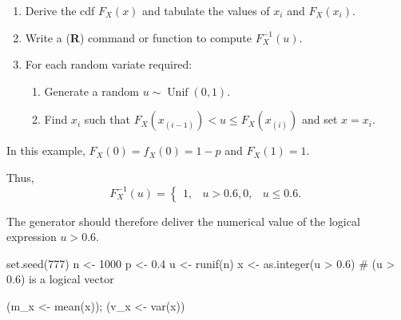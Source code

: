 \documentclass[
  letterpaper,
  DIV=11,
  numbers=noendperiod]{scrreprt}
\newenvironment{Shaded}{\begin{snugshade}}{\end{snugshade}}
\newcommand{\CommentTok}[1]{\textcolor[rgb]{0.37,0.37,0.37}{#1}}
\newcommand{\DecValTok}[1]{\textcolor[rgb]{0.68,0.00,0.00}{#1}}
\newcommand{\FloatTok}[1]{\textcolor[rgb]{0.68,0.00,0.00}{#1}}
\newcommand{\FunctionTok}[1]{\textcolor[rgb]{0.28,0.35,0.67}{#1}}
\newcommand{\NormalTok}[1]{\textcolor[rgb]{0.00,0.23,0.31}{#1}}
\newcommand{\OtherTok}[1]{\textcolor[rgb]{0.00,0.23,0.31}{#1}}
\newcommand{\SpecialCharTok}[1]{\textcolor[rgb]{0.37,0.37,0.37}{#1}}
\providecommand{\tightlist}{%
  \setlength{\itemsep}{0pt}\setlength{\parskip}{0pt}}
\begin{document}
\begin{tcolorbox}[enhanced jigsaw, colframe=quarto-callout-note-color-frame, coltitle=black, left=2mm, colback=white, titlerule=0mm, breakable, rightrule=.15mm, colbacktitle=quarto-callout-note-color!10!white, toptitle=1mm, bottomtitle=1mm, opacityback=0, bottomrule=.15mm, title=\textcolor{quarto-callout-note-color}{\faInfo}\hspace{0.5em}{Procedure with ITM for discrete case}, arc=.35mm, toprule=.15mm, leftrule=.75mm, opacitybacktitle=0.6]

\begin{enumerate}
\def\labelenumi{\arabic{enumi}.}
\item
  Derive the cdf \(F_X(x)\) and tabulate the values of \(x_i\) and
  \(F_X(x_i)\).
\item
  Write a (\textbf{R}) command or function to compute \(F_X^{-1}(u)\).
\item
  For each random variate required:

  \begin{enumerate}
  \def\labelenumii{\roman{enumii})}
  \tightlist
  \item
    Generate a random \(u\sim \operatorname{Unif}(0,1)\).
  \item
    Find \(x_i\) such that \(F_X(x_{(i-1)}) < u \leq F_X(x_{(i)})\) and
    set \(x = x_i\).
  \end{enumerate}
\end{enumerate}

\end{tcolorbox}

In this example, \(F_X(0) = f_X(0) = 1 - p\) and \(F_X(1) = 1\).

Thus, \[
F_X^{-1}(u) = 
\begin{cases}
1, & u > 0.6,
0, & u \leq 0.6.
\end{cases}
\]

The generator should therefore deliver the numerical value of the
logical expression \(u > 0.6\).

\begin{Shaded}
\begin{Highlighting}[]
\FunctionTok{set.seed}\NormalTok{(}\DecValTok{777}\NormalTok{)}
\NormalTok{n }\OtherTok{\textless{}{-}} \DecValTok{1000}
\NormalTok{p }\OtherTok{\textless{}{-}} \FloatTok{0.4}
\NormalTok{u }\OtherTok{\textless{}{-}} \FunctionTok{runif}\NormalTok{(n)}
\NormalTok{x }\OtherTok{\textless{}{-}} \FunctionTok{as.integer}\NormalTok{(u }\SpecialCharTok{\textgreater{}} \FloatTok{0.6}\NormalTok{)  }\CommentTok{\# (u \textgreater{} 0.6) is a logical vector}

\NormalTok{(m\_x }\OtherTok{\textless{}{-}} \FunctionTok{mean}\NormalTok{(x));  (v\_x }\OtherTok{\textless{}{-}} \FunctionTok{var}\NormalTok{(x))}
\end{Highlighting}
\end{Shaded}
\end{document}
